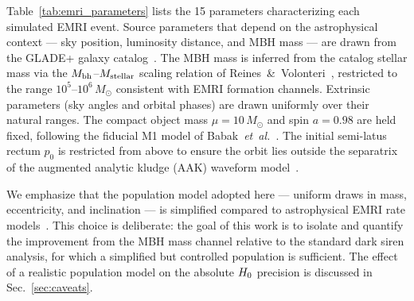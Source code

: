 
Table~\ref{tab:emri_parameters} lists the 15 parameters characterizing
each simulated EMRI event.  Source parameters that depend on the
astrophysical context --- sky position, luminosity distance, and MBH
mass --- are drawn from the GLADE+ galaxy catalog~\cite{Dalya:2021ewn}.
The MBH mass is inferred from the catalog stellar mass via the
$M_\mathrm{bh}$--$M_\mathrm{stellar}$ scaling relation of
Reines~\&~Volonteri~\cite{Reines:2015moa}, restricted to the range
$10^5$--$10^6\,M_\odot$ consistent with EMRI formation channels.
Extrinsic parameters (sky angles and orbital phases) are drawn uniformly
over their natural ranges.  The compact object mass $\mu = 10\,M_\odot$
and spin $a = 0.98$ are held fixed, following the fiducial M1 model of
Babak~\emph{et~al.}~\cite{Babak:2017tow}.  The initial semi-latus
rectum $p_0$ is restricted from above to ensure the orbit lies outside
the separatrix of the augmented analytic kludge (AAK)
waveform model~\cite{Chua:2020stf,Katz:2021yft}.

We emphasize that the population model adopted here --- uniform draws
in mass, eccentricity, and inclination --- is simplified compared
to astrophysical EMRI rate models~\cite{Babak:2017tow}.  This choice
is deliberate: the goal of this work is to isolate and quantify the
improvement from the MBH mass channel relative to the standard dark
siren analysis, for which a simplified but controlled population is
sufficient.  The effect of a realistic population model on the absolute
$H_0$ precision is discussed in Sec.~\ref{sec:caveats}.

